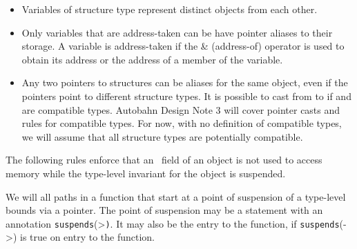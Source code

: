 \begin{itemize}
\item
  Variables of structure type represent distinct objects from each
  other.
\item
  Only variables that are address-taken can be have pointer aliases to
  their storage. A variable is address-taken if the \& (address-of)
  operator is used to obtain its address or the address of a member of
  the variable.
\item
  Any two pointers to structures can be aliases for the same object,
  even if the pointers point to different structure types. It is
  possible to cast from  to
  \ptrT if  and
   are compatible types. Autobahn Design Note 3 will cover
  pointer casts and rules for compatible types. For now, with no
  definition of compatible types, we will assume that all structure
  types are potentially compatible.
\end{itemize}

The following rules enforce that an \arrayptr\ field of an
object is not used to access memory while the type-level invariant for
the object is suspended.

We will all paths in a function that start at a point of suspension of a
type-level bounds via a pointer. The point of suspension may be a
statement with an annotation
\texttt{suspends}(\textgreater{}\texttt{)}.
It may also be the entry to the function, if
\texttt{suspends}(-\textgreater{}) is true on
entry to the function.

